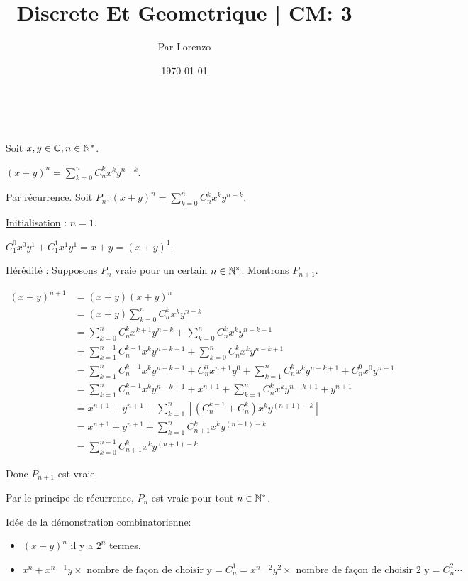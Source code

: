 \documentclass[a4paper, 12pt]{article}
\title{Discrete Et Geometrique | CM: 3}
\author{Par Lorenzo}
\date{\today}
\begin{document}
\maketitle

\begin{theorem}\

    Soit $x, y \in \mathbb{C}, n \in \mathbb{N}^*$.

    $(x + y)^n = \sum_{k=0}^n C^k_n x^k y^{n-k}$.
\end{theorem}

\begin{demonstration}
    Par récurrence.
    Soit $P_n: (x + y)^n = \sum_{k=0}^n C^k_n x^k y^{n-k}$.

    \noindent\underline{Initialisation} : $n = 1$.

    $C_1^0x^0y^1 + C_1^1x^1y^1 = x + y = (x + y)^1$.

    \noindent\underline{Hérédité} : Supposons $P_n$ vraie pour un certain $n \in \mathbb{N}^*$. Montrons $P_{n+1}$.

    \begin{align*}
        (x + y)^{n+1} &= (x + y)(x + y)^n \\
        &= (x + y)\sum_{k=0}^n C^k_n x^k y^{n-k} \\
        &= \sum_{k=0}^n C^k_n x^{k+1} y^{n-k} + \sum_{k=0}^n C^k_n x^k y^{n-k+1} \\
        &= \sum_{k=1}^{n+1} C^{k-1}_n x^k y^{n-k+1} + \sum_{k=0}^n C^k_n x^k y^{n-k+1} \\
        &= \sum_{k=1}^{n} C^{k-1}_n x^k y^{n-k+1} + C^n_n x^{n+1} y^{0} + \sum_{k=1}^{n} C^k_n x^k y^{n-k+1} + C^0_n x^0 y^{n+1} \\
        &= \sum_{k=1}^{n} C^{k-1}_n x^k y^{n-k+1} + x^{n+1} + \sum_{k=1}^{n} C^k_n x^k y^{n-k+1} + y^{n+1} \\
        &= x^{n+1} + y^{n+1} + \sum_{k=1}^n [(C^{k-1}_n + C^k_n) x^k y^{(n+1)-k}] \\
        &= x^{n+1} + y^{n+1} + \sum_{k=1}^n C^{k}_{n+1} x^k y^{(n+1)-k} \\
        &= \sum_{k=0}^{n+1} C^k_{n+1} x^k y^{(n+1)-k}
    \end{align*}

    Donc $P_{n+1}$ est vraie.

    Par le principe de récurrence, $P_n$ est vraie pour tout $n \in \mathbb{N}^*$.

\end{demonstration}

\begin{remark}
    Idée de la démonstration combinatorienne:
    \begin{itemize}
        \item $(x + y)^n$ il y a $2^n$ termes.
        \item $x^n + x^{n-1}y \times \text{ nombre de façon de choisir y} = C^1_n = x^{n-2}y^{2} \times \text{ nombre de façon de choisir 2 y} = C^2_n \cdots$
    \end{itemize}
\end{remark}
\end{document}
